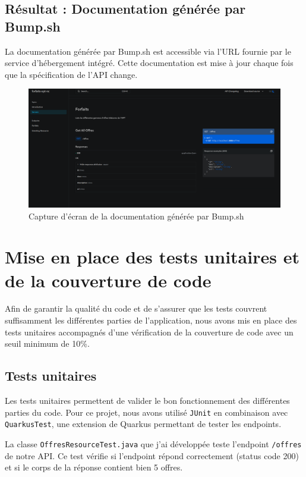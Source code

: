 \documentclass{article}
\begin{document}
	\subsection{Résultat : Documentation générée par Bump.sh}
	
	La documentation générée par Bump.sh est accessible via l'URL fournie par le service d'hébergement intégré. Cette documentation est mise à jour chaque fois que la spécification de l'API change.
	
	\begin{figure}[h!]
		\centering
		\includegraphics[width=\textwidth]{asset/bump-sh-documentation.png}
		\caption{Capture d'écran de la documentation générée par Bump.sh}
	\end{figure}

	
	
	\section{Mise en place des tests unitaires et de la couverture de code}
	
	Afin de garantir la qualité du code et de s'assurer que les tests couvrent suffisamment les différentes parties de l'application, nous avons mis en place des tests unitaires accompagnés d'une vérification de la couverture de code avec un seuil minimum de 10\%.
	
	\subsection{Tests unitaires}
	Les tests unitaires permettent de valider le bon fonctionnement des différentes parties du code. Pour ce projet, nous avons utilisé \texttt{JUnit} en combinaison avec \texttt{QuarkusTest}, une extension de Quarkus permettant de tester les endpoints. 
	
	La classe \texttt{OffresResourceTest.java} que j'ai développée teste l'endpoint \texttt{/offres} de notre API. Ce test vérifie si l'endpoint répond correctement (status code 200) et si le corps de la réponse contient bien 5 offres.
	
\end{document}
